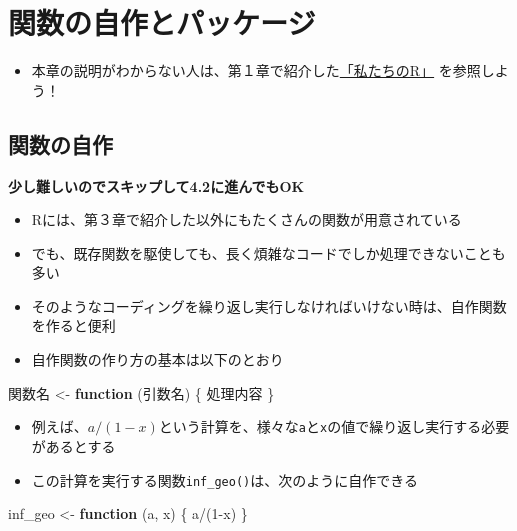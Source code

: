 \documentclass[
]{book}
\newenvironment{Shaded}{\begin{snugshade}}{\end{snugshade}}
\newcommand{\ControlFlowTok}[1]{\textcolor[rgb]{0.13,0.29,0.53}{\textbf{#1}}}
\newcommand{\DecValTok}[1]{\textcolor[rgb]{0.00,0.00,0.81}{#1}}
\newcommand{\NormalTok}[1]{#1}
\newcommand{\OtherTok}[1]{\textcolor[rgb]{0.56,0.35,0.01}{#1}}
\newcommand{\SpecialCharTok}[1]{\textcolor[rgb]{0.00,0.00,0.00}{#1}}
\providecommand{\tightlist}{%
  \setlength{\itemsep}{0pt}\setlength{\parskip}{0pt}}
\begin{document}
\hypertarget{ux95a2ux6570ux306eux81eaux4f5cux3068ux30d1ux30c3ux30b1ux30fcux30b8}{%
\chapter{関数の自作とパッケージ}\label{ux95a2ux6570ux306eux81eaux4f5cux3068ux30d1ux30c3ux30b1ux30fcux30b8}}

\begin{itemize}
\tightlist
\item
  本章の説明がわからない人は、第１章で紹介した\href{https://www.jaysong.net/RBook/datahandling1.html}{「私たちのR」} を参照しよう！
\end{itemize}

\hypertarget{ux95a2ux6570ux306eux81eaux4f5c}{%
\section{関数の自作}\label{ux95a2ux6570ux306eux81eaux4f5c}}

\textbf{少し難しいのでスキップして4.2に進んでもOK }

\begin{itemize}
\tightlist
\item
  Rには、第３章で紹介した以外にもたくさんの関数が用意されている
\item
  でも、既存関数を駆使しても、長く煩雑なコードでしか処理できないことも多い
\item
  そのようなコーディングを繰り返し実行しなければいけない時は、自作関数を作ると便利
\item
  自作関数の作り方の基本は以下のとおり
\end{itemize}

\begin{Shaded}
\begin{Highlighting}[]
\NormalTok{関数名 }\OtherTok{\textless{}{-}} \ControlFlowTok{function}\NormalTok{ (引数名) \{}
\NormalTok{  処理内容}
\NormalTok{\}}
\end{Highlighting}
\end{Shaded}

\begin{itemize}
\tightlist
\item
  例えば、\(a/(1-x)\)という計算を、様々な\texttt{a}と\texttt{x}の値で繰り返し実行する必要があるとする
\item
  この計算を実行する関数\texttt{inf\_geo()}は、次のように自作できる
\end{itemize}

\begin{Shaded}
\begin{Highlighting}[]
\NormalTok{inf\_geo }\OtherTok{\textless{}{-}} \ControlFlowTok{function}\NormalTok{ (a, x) \{}
\NormalTok{  a}\SpecialCharTok{/}\NormalTok{(}\DecValTok{1}\SpecialCharTok{{-}}\NormalTok{x)}
\NormalTok{\}}
\end{Highlighting}
\end{Shaded}
\end{document}

